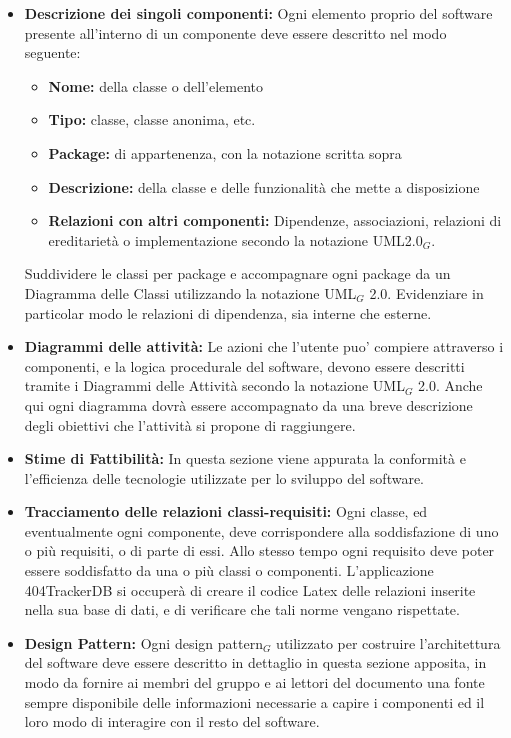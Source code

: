 \begin{itemize}
\item\textbf{Descrizione dei singoli componenti:} Ogni elemento proprio del software presente all'interno di un componente deve essere descritto nel modo seguente:
\begin{itemize}
\item \textbf{Nome:} della classe o dell'elemento
\item \textbf{Tipo:} classe, classe anonima, etc.
\item \textbf{Package:} di appartenenza, con la notazione scritta sopra
\item \textbf{Descrizione:} della classe e delle funzionalità che mette a disposizione
\item \textbf{Relazioni con altri componenti:} Dipendenze, associazioni, relazioni di ereditarietà o implementazione secondo la notazione UML2.0$_G$.
\end{itemize}
Suddividere le classi per package e accompagnare ogni package da un Diagramma delle Classi utilizzando la notazione UML$_G$ 2.0. Evidenziare in particolar modo le relazioni di dipendenza, sia interne che esterne.
\item \textbf{Diagrammi delle attività:}
Le azioni che l'utente puo' compiere attraverso i componenti, e la logica procedurale del software, devono essere descritti tramite i Diagrammi delle Attività secondo la notazione UML$_G$ 2.0. Anche qui ogni diagramma dovrà essere accompagnato da una breve descrizione degli obiettivi che l'attività si propone di raggiungere.
\item \textbf{Stime di Fattibilità:} In questa sezione viene appurata la conformità e l'efficienza delle tecnologie utilizzate per lo sviluppo del software.
\item \textbf{Tracciamento delle relazioni classi-requisiti:} Ogni classe, ed eventualmente ogni componente, deve corrispondere alla soddisfazione di uno o più requisiti, o di parte di essi. Allo stesso tempo ogni requisito deve poter essere soddisfatto da una o più classi o componenti. L'applicazione 404TrackerDB si occuperà di creare il codice Latex delle relazioni inserite nella sua base di dati, e di verificare che tali norme vengano rispettate.
\item \textbf{Design Pattern:} Ogni design pattern$_G$ utilizzato per costruire l'architettura del software deve essere descritto in dettaglio in questa sezione apposita, in modo da fornire ai membri del gruppo e ai lettori del documento una fonte sempre disponibile delle informazioni necessarie a capire i componenti ed il loro modo di interagire con il resto del software.
\end{itemize}

